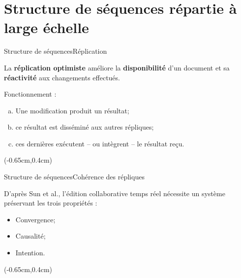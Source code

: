 \section{Structure de séquences répartie à large échelle}

\begin{frame}{Structure de séquences}{Réplication}
  \vspace{-1.5cm}

  La \textbf{réplication optimiste} améliore
  la \textbf{disponibilité} d'un document et sa \textbf{réactivité} aux
  changements effectués.  \vspace{0.75cm}

  Fonctionnement :
  \begin{enumerate}[(a)]
  \item Une modification produit un résultat;
  \item ce résultat est disséminé aux autres répliques;
  \item ces dernières exécutent -- ou intègrent -- le résultat reçu.
  \end{enumerate}

  \begin{textblock*}{\textwidth}(-0.65cm,0.4cm) 
    
  \end{textblock*}
  
  \vspace{1cm}

\end{frame}


\begin{frame}{Structure de séquences}{Cohérence des répliques}
  
  \vspace{-1.5cm}

  D'après Sun et al., l'édition collaborative
  temps réel nécessite un système préservant les trois propriétés :

  \begin{itemize}
  \item Convergence;
  \item Causalité;
  \item Intention.  
  \end{itemize}

  \begin{textblock*}{\textwidth}(-0.65cm,0.4cm) 
    
  \end{textblock*}

\end{frame}


